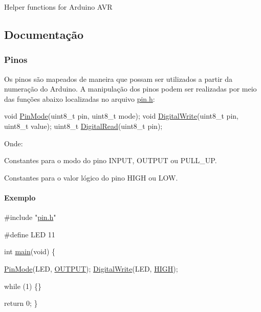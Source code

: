 Helper functions for Arduino A\+VR

\subsection*{Documentação}

\subsubsection*{Pinos}

Os pinos são mapeados de maneira que possam ser utilizados a partir da numeração do Arduino. A manipulação dos pinos podem ser realizadas por meio das funções abaixo localizadas no arquivo {\ttfamily \mbox{\hyperlink{pin_8h}{pin.\+h}}}\+:


\begin{DoxyCode}
\textcolor{keywordtype}{void} \mbox{\hyperlink{pin_8h_aa6ddb0ae5554ea2f1b9254e1985bacc4}{PinMode}}(uint8\_t pin, uint8\_t mode);
\textcolor{keywordtype}{void} \mbox{\hyperlink{pin_8h_ab02e820a1ed8c8e0f68629b262a1203f}{DigitalWrite}}(uint8\_t pin, uint8\_t value);
uint8\_t \mbox{\hyperlink{pin_8h_a379860e4c42182ae5824be8cd814ba9e}{DigitalRead}}(uint8\_t pin);
\end{DoxyCode}


Onde\+:
\begin{DoxyItemize}
\item Constantes para o modo do pino {\ttfamily I\+N\+P\+UT}, {\ttfamily O\+U\+T\+P\+UT} ou {\ttfamily P\+U\+L\+L\+\_\+\+UP}.
\item Constantes para o valor lógico do pino {\ttfamily H\+I\+GH} ou {\ttfamily L\+OW}.
\end{DoxyItemize}

\paragraph*{Exemplo}


\begin{DoxyCode}
\textcolor{preprocessor}{#include "\mbox{\hyperlink{pin_8h}{pin.h}}"}

\textcolor{preprocessor}{#define LED 11}

\textcolor{keywordtype}{int} \mbox{\hyperlink{main_8c_a840291bc02cba5474a4cb46a9b9566fe}{main}}(\textcolor{keywordtype}{void}) \{

  \mbox{\hyperlink{pin_8h_aa6ddb0ae5554ea2f1b9254e1985bacc4}{PinMode}}(LED, \mbox{\hyperlink{pin_8h_a61a3c9a18380aafb6e430e79bf596557}{OUTPUT}});
  \mbox{\hyperlink{pin_8h_ab02e820a1ed8c8e0f68629b262a1203f}{DigitalWrite}}(LED, \mbox{\hyperlink{pin_8h_a5bb885982ff66a2e0a0a45a8ee9c35e2}{HIGH}});

  \textcolor{keywordflow}{while} (1) \{\}

  \textcolor{keywordflow}{return} 0;
\}
\end{DoxyCode}


